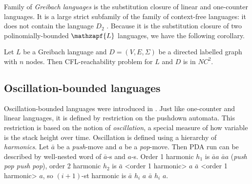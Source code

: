 Family of \textit{Greibach languages} is the substitution closure of linear and one-counter languages. It is a large strict subfamily of the family of context-free languages: it does not contain the language $D_2$ \cite{Autebert1997}. Because it is the substitution closure of two polinomially-bounded $\mathzapf{L}$ languages, we have the following corollary.
\begin{corollary} 
Let  $L$ be a Greibach language and $D=(V, E, \Sigma)$ be a directed labelled graph with $n$ nodes. Then CFL-reachability problem for $L$ and $D$ is in $NC^2$.
\end{corollary}
\subsection{Oscillation-bounded languages}
Oscillation-bounded languages were introduced in \cite{BoundOsc}. Just like one-counter and linear languages, it is defined by restriction on the pushdown automata. This restriction is based on the notion of \textit{oscillation}, a special measure of how variable is the stack height over time. Oscillation is defined using a hierarchy of \textit{harmonics}. Let $\bar{a}$ be a \textit{push}-move and $a$ be a \textit{pop}-move. Then PDA run can be described by well-nested word of $\bar{a}$-s and $a$-s. Order 1 harmonic $h_1$ is $\bar{a}a$ $\bar{a}a$ (\textit{push pop push pop}), order 2 harmonic $h_2$ is $\bar{a}$ <order 1 harmonic> $a$ $\bar{a}$ <order 1 harmonic> $a$, so $(i+1)$-st harmonic is $\bar{a}$ $h_i$ $a$ $\bar{a}$ $h_i$ $a$.



